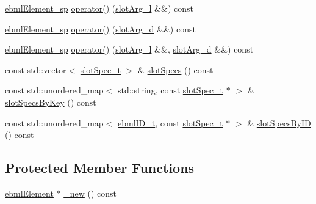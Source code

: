 \begin{DoxyCompactItemize}
\item 
\mbox{\hyperlink{namespaceebml_adad533b7705a16bb360fe56380c5e7be}{ebml\+Element\+\_\+sp}} \mbox{\hyperlink{classebml_1_1ebmlMultiSlotClass_ae62906b659277cc8de283a27a8bceed2}{operator()}} (\mbox{\hyperlink{namespaceebml_ae432575dfbb3e141ce897442794f0ca5}{slot\+Arg\+\_\+l}} \&\&) const
\item 
\mbox{\hyperlink{namespaceebml_adad533b7705a16bb360fe56380c5e7be}{ebml\+Element\+\_\+sp}} \mbox{\hyperlink{classebml_1_1ebmlMultiSlotClass_aaba4e03050493237191b214950972295}{operator()}} (\mbox{\hyperlink{namespaceebml_a4317d4c495715eced3ed448c2d05caeb}{slot\+Arg\+\_\+d}} \&\&) const
\item 
\mbox{\hyperlink{namespaceebml_adad533b7705a16bb360fe56380c5e7be}{ebml\+Element\+\_\+sp}} \mbox{\hyperlink{classebml_1_1ebmlMultiSlotClass_a22f33854de534b0cee9c7e2fe8d3be00}{operator()}} (\mbox{\hyperlink{namespaceebml_ae432575dfbb3e141ce897442794f0ca5}{slot\+Arg\+\_\+l}} \&\&, \mbox{\hyperlink{namespaceebml_a4317d4c495715eced3ed448c2d05caeb}{slot\+Arg\+\_\+d}} \&\&) const
\item 
const std\+::vector$<$ \mbox{\hyperlink{classebml_1_1slotSpec__t}{slot\+Spec\+\_\+t}} $>$ \& \mbox{\hyperlink{classebml_1_1ebmlMultiSlotClass_a8c0a510fb0de82566caa77d27127937c}{slot\+Specs}} () const
\item 
const std\+::unordered\+\_\+map$<$ std\+::string, const \mbox{\hyperlink{classebml_1_1slotSpec__t}{slot\+Spec\+\_\+t}} $\ast$ $>$ \& \mbox{\hyperlink{classebml_1_1ebmlMultiSlotClass_a57c1d13ad108cdd5b0cb0b717ef4ef92}{slot\+Specs\+By\+Key}} () const
\item 
const std\+::unordered\+\_\+map$<$ \mbox{\hyperlink{namespaceebml_a86c5f604ddf12a74aa9812e997a58691}{ebml\+I\+D\+\_\+t}}, const \mbox{\hyperlink{classebml_1_1slotSpec__t}{slot\+Spec\+\_\+t}} $\ast$ $>$ \& \mbox{\hyperlink{classebml_1_1ebmlMultiSlotClass_abb2d4a01a3c8048471cc26d5f14dc88d}{slot\+Specs\+By\+ID}} () const
\end{DoxyCompactItemize}
\subsection*{Protected Member Functions}
\begin{DoxyCompactItemize}
\item 
\mbox{\hyperlink{classebml_1_1ebmlElement}{ebml\+Element}} $\ast$ \mbox{\hyperlink{classebml_1_1ebmlMultiSlotClass_a51b5c0c3c0aa3c2e54e63f536413b5a5}{\+\_\+new}} () const
\end{DoxyCompactItemize}
